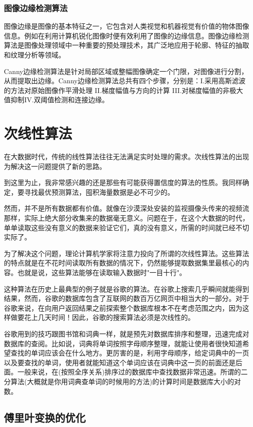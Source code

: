 \subsubsection{图像边缘检测算法}
图像边缘是图像的基本特征之一，它包含对人类视觉和机器视觉有价值的物体图像信息。例如在利用计算机锐化图像时便有效利用了图像的边缘信息。图像边缘检测算法是图像处理领域中一种重要的预处理技术，其广泛地应用于轮廓、特征的抽取和纹理分析等领域。

Canny边缘检测算法是针对局部区域或整幅图像确定一个门限，对图像进行分割，从而提取出边缘。Canny边缘检测算法总共有四个步骤，分别是：I.采用高斯滤波的方法对原始图像作平滑处理 II.梯度幅值与方向的计算 III.对梯度幅值的非极大值抑制IV.双阈值检测和连接边缘。

\section{次线性算法}

在大数据时代，传统的线性算法往往无法满足实时处理的需求。次线性算法的出现为解决这一问题提供了新的思路。

到这里为止，我非常感兴趣的还是那些有可能获得置信度的算法的性质。我同样确定，要寻找最优预测算法，囤积海量数据是必不可少的。

然而，并不是所有数据都有价值。就像在沙漠深处安装的监视摄像头传来的视频流那样，实际上绝大部分收集来的数据毫无意义。问题在于，在这个大数据的时代，单单读取这些没有意义的数据来验证它们，真的没有意义，所需的时间就已经不切实际了。

为了解决这个问题，理论计算机学家将注意力投向了所谓的次线性算法。这些算法的特点就是在不花时间读取所有数据的情况下，仍然能够提取数据集里最核心的内容。也就是说，这些算法能够在读取输入数据时"一目十行"。

这种算法在历史上最典型的例子就是谷歌的算法。在谷歌上搜索几乎瞬间就能得到结果，然而，谷歌的数据库包含了互联网的数百万亿网页中相当大的一部分。对于谷歌来说，在向用户返回结果之前探索整个数据库根本不在考虑范围之内，因为这样做要花上几天时间！因此，谷歌的搜索算法必须是次线性的。

谷歌用到的技巧跟图书馆和词典一样，就是预先对数据库排序和整理，迅速完成对数据库的查阅。比如说，词典将单词按照字母顺序整理，就能让使用者很快知道希望查找的单词应该会在什么地方。更厉害的是，利用字母顺序，给定词典中的一页以及要查找的单词，使用者就能知道这个单词应该在词典中这一页的前面还是后面。一般来说，在(按照全序关系)排序过的数据库中查找数据非常迅速。所谓的二分算法(大概就是你用词典查单词的时候用的方法)的计算时间是数据库大小的对数。

\subsection{傅里叶变换的优化}

